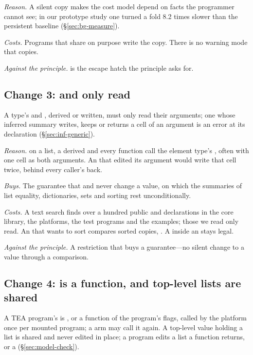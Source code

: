 \emph{Reason.} A silent copy makes the cost model depend on facts the programmer cannot see; in our
prototype study one turned a fold 8.2 times slower than the persistent baseline (\S\ref{sec:bg-measure}).

\emph{Costs.} Programs that share on purpose write the copy. There is no warning mode that copies.

\emph{Against the principle.}  is the escape hatch the principle asks for.

\subsection*{Change 3:  and  only read}

A type's  and , derived or written, must only read their arguments; one whose
inferred summary writes, keeps or returns a cell of an argument is an error at its declaration
(\S\ref{sec:inf-generic}).

\emph{Reason.} \code{==} on a list, a derived  and every  function call the
element type's , often with one cell as both arguments. An  that edited its argument
would write that cell twice, behind every caller's back.

\emph{Buys.} The guarantee that \code{==} and \code{<} never change a value, on which the summaries of list
equality, dictionaries, sets and sorting rest unconditionally.

\emph{Costs.} A text search finds over a hundred public  and  declarations in the
core library, the platforms, the test programs and the examples; those we read only read. An 
that wants to sort compares sorted copies, . A  inside an
 stays legal.

\emph{Against the principle.} A restriction that buys a guarantee---no silent change to a value through a
comparison.

\subsection*{Change 4:  is a function, and top-level lists are shared}

A TEA program's  is , or a function of the program's flags,
called by the platform once per mounted program; a  arm may call it again. A top-level value
holding a list is shared and never edited in place; a program edits a list a function returns, or a
 (\S\ref{sec:model-check}).

